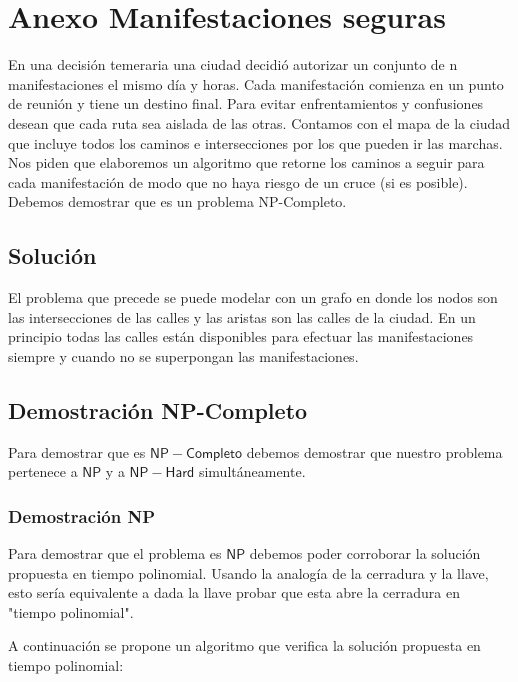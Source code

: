 \section{Anexo Manifestaciones seguras}

En una decisión temeraria una ciudad decidió autorizar un conjunto de n manifestaciones el mismo día y horas. Cada manifestación comienza en un punto de reunión y tiene un destino final. Para evitar enfrentamientos y confusiones desean que cada ruta sea aislada de las otras. Contamos con el mapa de la ciudad que incluye todos los caminos e intersecciones por los que pueden ir las marchas. Nos piden que elaboremos un algoritmo que retorne los caminos a seguir para cada manifestación de modo que no haya riesgo de un cruce (si es posible).\newline
Debemos demostrar que es un problema NP-Completo.

\subsection{Solución}
El problema que precede se puede modelar con un grafo en donde los nodos son las intersecciones de las calles y las aristas son las calles de la ciudad. En un principio todas las calles están disponibles para efectuar las manifestaciones siempre y cuando no se superpongan las manifestaciones.

\subsection{Demostración NP-Completo}
Para demostrar que es $\mathsf{NP-Completo}$ debemos demostrar que nuestro problema pertenece a $\mathsf{NP}$ y a $\mathsf{NP-Hard}$ simultáneamente.

\subsubsection{Demostración NP}
Para demostrar que el problema es $\mathsf{NP}$ debemos poder corroborar la solución propuesta en tiempo polinomial. Usando la analogía de la cerradura y la llave, esto sería equivalente a dada la llave probar que esta abre la cerradura en "tiempo polinomial". \newline

A continuación se propone un algoritmo que verifica la solución propuesta en tiempo polinomial:

